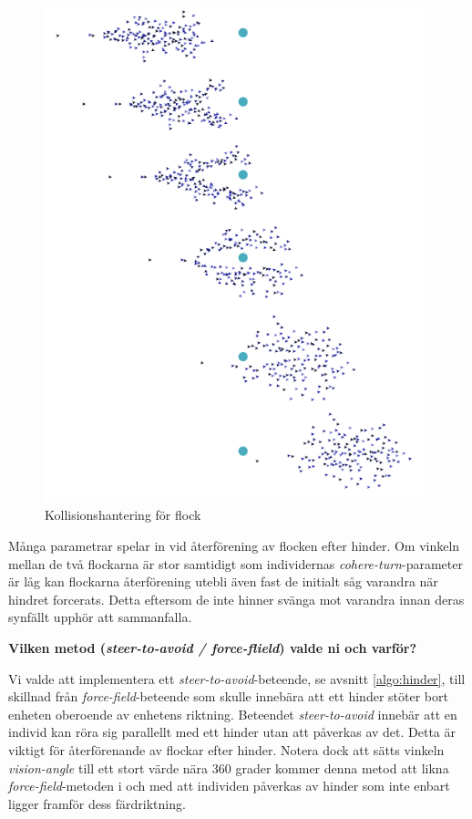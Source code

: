 \documentclass[titlepage, a4paper, 12pt]{article}
\begin{document}
\begin{figure}[H]
  \begin{center}
    \includegraphics[width=110mm]{images/flock.png}
    \caption{Kollisionshantering för flock}
    \label{fig:flock}
  \end{center}
\end{figure}

Många parametrar spelar in vid återförening av flocken efter
hinder. Om vinkeln mellan de två flockarna är stor samtidigt som
individernas \textit{cohere-turn}-parameter är låg kan flockarna
återförening utebli även fast de initialt såg varandra när hindret
forcerats. Detta eftersom de inte hinner svänga mot varandra innan
deras synfällt upphör att sammanfalla.

\textbf{Vilken metod (\textit{steer-to-avoid / force-flield}) valde ni
  och varför?}


Vi valde att implementera ett \textit{steer-to-avoid}-beteende, se
avsnitt \ref{algo:hinder}, till skillnad från
\textit{force-field}-beteende som skulle innebära att ett hinder
stöter bort enheten oberoende av enhetens riktning. Beteendet
\textit{steer-to-avoid} innebär att en individ kan röra sig parallellt
med ett hinder utan att påverkas av det. Detta är viktigt för
återförenande av flockar efter hinder. Notera dock att sätts vinkeln
\textit{vision-angle} till ett stort värde nära 360 grader kommer
denna metod att likna \textit{force-field}-metoden i och med att
individen påverkas av hinder som inte enbart ligger framför dess
färdriktning.
\end{document}
